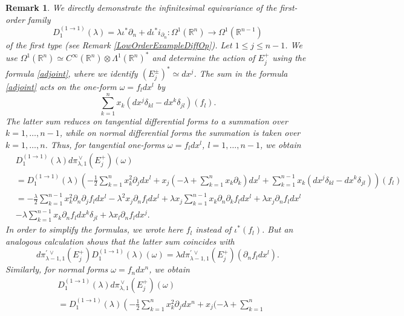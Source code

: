 \documentclass[a4paper,12pt,reqno]{amsart}
\newtheorem{bem}[theorem]{Remark}
\numberwithin{theorem}{subsection}
\numberwithin{equation}{section}
\begin{document}
\begin{bem}\label{equiv-fam-1} We directly demonstrate the infinitesimal equivariance of
the first-order family
$$
   D^{(1\to 1)}_1(\lambda) = \lambda \iota^*\partial_n + {d} \iota^* i_{\partial_n}:
   \Omega^1({\mathbb{R}}^n) \to \Omega^1({\mathbb{R}}^{n-1})
$$
of the first type (see Remark \ref{LowOrderExampleDiffOp}). Let $1 \le j \le
n-1$. We use $\Omega^1({\mathbb{R}}^n) \simeq C^\infty({\mathbb{R}}^n) \otimes \Lambda^1({\mathbb{R}}^n)^*$
and determine the action of $E_j^+$ using the formula \eqref{adjoint}, where we
identify $(E_j^\pm)^* \simeq dx^j$. The sum in the formula \eqref{adjoint} acts
on the one-form $\omega = f_l dx^l$ by
$$
   \sum_{k=1}^n x_k (dx^j \delta_{kl} - dx^k \delta_{jl})(f_l).
$$
The latter sum reduces on tangential differential forms to a summation over
$k=1,\dots,n-1$, while on normal differential forms the summation is taken over
$k=1,\dots,n$. Thus, for tangential one-forms $\omega = f_l dx^l$,
$l=1,\dots,n-1$, we obtain
\begin{align*}
    & D^{(1\to 1)}_1(\lambda) {d}\pi^{{\,\vee}}_{\lambda,1}(E_j^+)(\omega) \\
    & = D^{(1\to 1)}_1(\lambda)
    \left(-\tfrac 12 \sum_{k=1}^n x_k^2 \partial_{j} dx^l + x_j(-\lambda + \sum_{k=1}^nx_k\partial_{k}) dx^l
    + \sum_{k=1}^{n-1} x_k (dx^j \delta_{kl} - dx^k \delta_{jl} )\right) (f_l) \\
    & = -\tfrac {\lambda}{2} \sum_{k=1}^{n-1} x_k^2 \partial_n
    \partial_j f_l dx^l - \lambda^2 x_j \partial_n f_l dx^l
    + \lambda x_j \sum_{k=1}^{n-1} x_k \partial_n\partial_k f_l dx^l + \lambda x_j \partial_n f_l dx^l \\
    & - \lambda \sum_{k=1}^{n-1} x_k
    \partial_n f_l dx^k \delta_{jl} + \lambda x_l \partial_n f_l dx^j.
\end{align*}
In order to simplify the formulas, we wrote here $f_l$ instead of
$\iota^*(f_l)$. But an analogous calculation shows that the latter sum
coincides with
\begin{equation*}
    {d}\pi^{\prime {{\,\vee}}}_{\lambda-1,1}(E_j^+) D^{(1\to 1)}_1(\lambda)(\omega) =
    \lambda {d}\pi^{\prime {{\,\vee}}}_{\lambda-1,1}(E_j^+) (\partial_n f_l dx^l).
\end{equation*}
Similarly, for normal forms $\omega = f_n dx^n$, we obtain
\begin{align*}
    & D^{(1\to 1)}_1(\lambda) {d}\pi^{{\,\vee}}_{\lambda,1}(E_j^+)(\omega)\\
    & = D^{(1\to 1)}_1(\lambda)
    \left(-\tfrac{1}{2} \sum_{k=1}^n x_k^2 \partial_{j} dx^n + x_j(-\lambda+\sum_{k=1}^n

\end{align*}
\end{bem}
\end{document}
